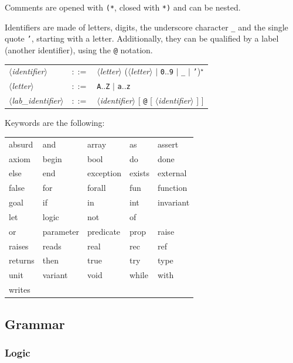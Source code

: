 \documentclass[a4paper,12pt]{report}
\makeatletter
\newcommand{\te}[1]{\texttt{#1}}
\newcommand{\nt}[1]{$\langle$\textsl{#1}$\rangle$}
\newcommand{\indexnt}[1]{\index{#1@\textsl{#1}, grammar entry}}
\newcommand{\etoile}{$^{\star}$}
\makeatother
\begin{document}
Comments are opened with \texttt{(*}, closed
with \texttt{*)} and can be nested.

Identifiers are made of letters, digits,
the underscore character \texttt{\_} and the single quote \texttt{'},
starting with a letter. Additionally, they can be qualified by a
label (another identifier), using the \texttt{@} notation.

\begin{center}
\begin{tabular}{lrl}
  \nt{identifier}\indexnt{identifier}
    & $::=$ & \nt{letter} (\nt{letter} $|$ \te{0}..\te{9} $|$
              \te{\_} $|$ \te{'})\etoile
  \\[0.1em]
  \nt{letter}
    & $::=$ & \te{A}..\te{Z} $|$ \te{a}..\te{z}
  \\[0.1em]
  \nt{lab\_identifier}\indexnt{lab\_identifier}
    & $::=$ & \nt{identifier} [ \te{@} [ \nt{identifier} ] ]
\end{tabular}
\end{center}

Keywords are the following:
\begin{center}
{\tt\begin{tabular}{l@{\qquad}l@{\qquad}l@{\qquad}l@{\qquad}l}
        absurd &
	and &
        array &
	as &
	assert \\
	axiom &
	begin &
        bool &
	do &
	done \\
        else &
	end &
	exception &
	exists &
	external \\
        false &
	for &
	forall &
	fun &
	function \\
	goal &
	if &
	in &
	int &
	invariant \\
	let &
	logic &
	not &
	of \\
	or &
	parameter &
	predicate &
	prop &
	raise \\
	raises &
	reads &
	real &
	rec &
	ref \\
	returns &
	then &
	true &
	try &
	type \\
	unit &
	variant &
	void &
	while &
	with \\
        writes &
\end{tabular}}
\end{center}

\subsection{Grammar}

\subsubsection{Logic}
\end{document}
